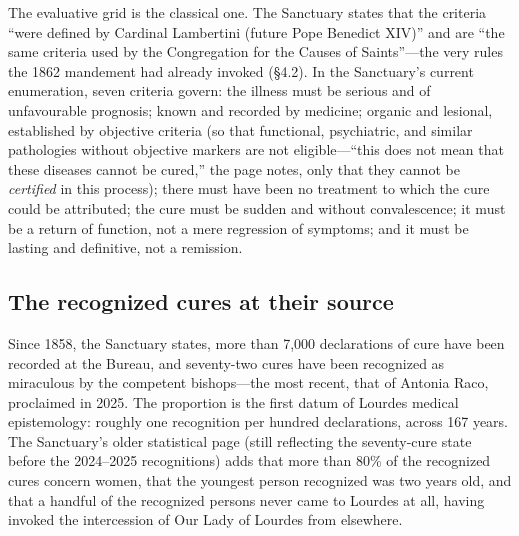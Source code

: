 The evaluative grid is the classical one. The Sanctuary states
that the criteria ``were defined by Cardinal Lambertini (future
Pope Benedict XIV)'' and are ``the same criteria used by the
Congregation for the Causes of Saints''---the very rules the 1862
mandement had already invoked (\S4.2). In the Sanctuary's current
enumeration, seven criteria govern: the illness must be serious
and of unfavourable prognosis; known and recorded by medicine;
organic and lesional, established by objective criteria (so that
functional, psychiatric, and similar pathologies without objective
markers are not eligible---``this does not mean that these
diseases cannot be cured,'' the page notes, only that they cannot
be \emph{certified} in this process); there must have been no
treatment to which the cure could be attributed; the cure must be
sudden and without convalescence; it must be a return of function,
not a mere regression of symptoms; and it must be lasting and
definitive, not a remission.

\subsection{The recognized cures at their source}

Since 1858, the Sanctuary states, more than 7{,}000 declarations
of cure have been recorded at the Bureau, and seventy-two cures
have been recognized as miraculous by the competent bishops---the
most recent, that of Antonia Raco, proclaimed in
2025. The proportion
is the first datum of Lourdes medical epistemology: roughly one
recognition per hundred declarations, across 167 years. The
Sanctuary's older statistical page (still reflecting the
seventy-cure state before the 2024--2025 recognitions) adds that
more than 80\% of the recognized cures concern women, that the
youngest person recognized was two years old, and that a handful
of the recognized persons never came to Lourdes at all, having
invoked the intercession of Our Lady of Lourdes from
elsewhere.

